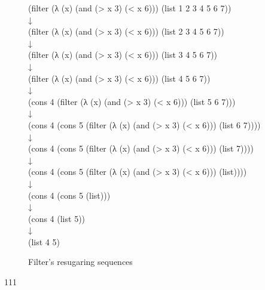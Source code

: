 \begin{figure}[ht]
	\centering
	\parbox[t]{\textwidth}{
	
				\begin{center}
				{
					\small\selectfont
					(filter (λ (x) (and (> x 3) (< x 6))) (list 1 2 3 4 5 6 7))\\
					↓\\
					(filter (λ (x) (and (> x 3) (< x 6))) (list 2 3 4 5 6 7))\\
					↓\\
					(filter (λ (x) (and (> x 3) (< x 6))) (list 3 4 5 6 7))\\
					↓\\
					(filter (λ (x) (and (> x 3) (< x 6))) (list 4 5 6 7))\\
					↓\\
					(cons 4 (filter (λ (x) (and (> x 3) (< x 6))) (list 5 6 7)))\\
					↓\\
					(cons 4 (cons 5 (filter (λ (x) (and (> x 3) (< x 6))) (list 6 7))))\\
					↓\\
					(cons 4 (cons 5 (filter (λ (x) (and (> x 3) (< x 6))) (list 7))))\\
					↓\\
					(cons 4 (cons 5 (filter (λ (x) (and (> x 3) (< x 6))) (list))))\\
					↓\\
					(cons 4 (cons 5 (list)))\\
					↓\\
					(cons 4 (list 5))\\
					↓\\
					(list 4 5)
				}
					
				\end{center}
				
			}
	\caption{Filter's resugaring sequences}
\label{fig:filter}
\end{figure}

111
